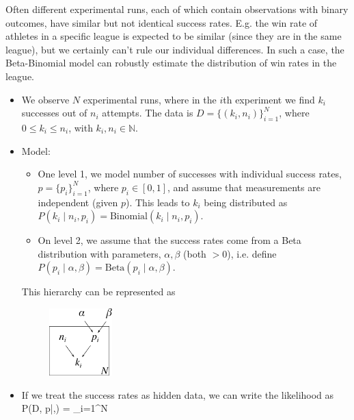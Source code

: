 
Often different experimental runs, each of which contain observations with binary outcomes, have similar but not identical success rates. E.g. the win rate of athletes in a specific league is expected to be similar (since they are in the same league), but we certainly can't rule our individual differences. In such a case, the Beta-Binomial model can robustly estimate the distribution of win rates in the league.
\begin{itemize}
	\item We observe $N$ experimental runs, where in the $i$th experiment we find  $k_i$ successes out of $n_i$ attempts. The data is $D = \{(k_i, n_i)\}_{i=1}^N$, where $0 \leq k_i\leq n_i$, with $k_i, n_i \in \mathds{N}$.

	\item Model: 
		\begin{itemize}
			\item One level 1, we model number of successes with individual success rates, $p = \{p_i\}_{i=1}^N$, where $p_i \in [0,1]$, and assume that measurements are independent (given $p$). This leads to $k_i$ being  distributed as $P(k_i\;|\;n_i, p_i) = \text{Binomial}(k_i\;|\;n_i, p_i)$.
			\item On level 2, we assume that the success rates come from a Beta distribution with parameters, $\alpha, \beta$ (both $>0$), i.e. define $P(p_i\;|\;\alpha, \beta) = \text{Beta}(p_i\;|\;\alpha, \beta)$.
		\end{itemize}
		This hierarchy can be represented as
		\begin{figure}[h!]
		\centering
			\includegraphics[height=26mm]{./figs/04-BetaBinomial.pdf}
		\end{figure}

	\item If we treat the success rates as hidden data, we can write the likelihood as
	\be
		P(D, p\;|\;\alpha,\beta) = \prod_{i=1}^N
	\ee


\end{itemize}
